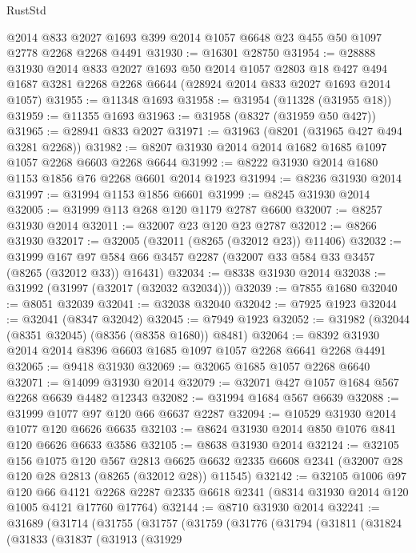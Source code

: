 \begin{lexlean}{RustStd}
\begin{coremodule}
    @2014
    @833
    @2027
    @1693
    @399
    @2014
    @1057
    @6648
    @23
    @455
    @50
    @1097
    @2778
    @2268
    @2268
    @4491
@31930 := @16301 @28750
@31954 := @28888
    @31930
    @2014
    @833
    @2027
    @1693
    @50
    @2014
    @1057
    @2803
    @18
    @427
    @494
    @1687
    @3281
    @2268
    @2268
    @6644
    (@28924 @2014 @833 @2027 @1693 @2014 @1057)
@31955 := @11348 @1693
@31958 := @31954 (@11328 (@31955 @18))
@31959 := @11355 @1693
@31963 := @31958 (@8327 (@31959 @50 @427))
@31965 := @28941 @833 @2027
@31971 := @31963 (@8201 (@31965 @427 @494 @3281 @2268))
@31982 := @8207 @31930 @2014 @2014 @1682 @1685 @1097 @1057 @2268 @6603 @2268 @6644
@31992 := @8222 @31930 @2014 @1680 @1153 @1856 @76 @2268 @6601 @2014 @1923
@31994 := @8236 @31930 @2014
@31997 := @31994 @1153 @1856 @6601
@31999 := @8245 @31930 @2014
@32005 := @31999 @113 @268 @120 @1179 @2787 @6600
@32007 := @8257 @31930 @2014
@32011 := @32007 @23 @120 @23 @2787
@32012 := @8266 @31930
@32017 := @32005 (@32011 (@8265 (@32012 @23)) @11406)
@32032 := @31999
    @167
    @97
    @584
    @66
    @3457
    @2287
    (@32007 @33 @584 @33 @3457 (@8265 (@32012 @33)) @16431)
@32034 := @8338 @31930 @2014
@32038 := @31992 (@31997 (@32017 (@32032 @32034)))
@32039 := @7855 @1680
@32040 := @8051 @32039
@32041 := @32038 @32040
@32042 := @7925 @1923
@32044 := @32041 (@8347 @32042)
@32045 := @7949 @1923
@32052 := @31982 (@32044 (@8351 @32045) (@8356 (@8358 @1680)) @8481)
@32064 := @8392 @31930 @2014 @2014 @8396 @6603 @1685 @1097 @1057 @2268 @6641 @2268 @4491
@32065 := @9418 @31930
@32069 := @32065 @1685 @1057 @2268 @6640
@32071 := @14099 @31930 @2014
@32079 := @32071 @427 @1057 @1684 @567 @2268 @6639 @4482 @12343
@32082 := @31994 @1684 @567 @6639
@32088 := @31999 @1077 @97 @120 @66 @6637 @2287
@32094 := @10529 @31930 @2014 @1077 @120 @6626 @6635
@32103 := @8624 @31930 @2014 @850 @1076 @841 @120 @6626 @6633 @3586
@32105 := @8638 @31930 @2014
@32124 := @32105
    @156
    @1075
    @120
    @567
    @2813
    @6625
    @6632
    @2335
    @6608
    @2341
    (@32007 @28 @120 @28 @2813 (@8265 (@32012 @28)) @11545)
@32142 := @32105
    @1006
    @97
    @120
    @66
    @4121
    @2268
    @2287
    @2335
    @6618
    @2341
    (@8314 @31930 @2014 @120 @1005 @4121 @17760 @17764)
@32144 := @8710 @31930 @2014
@32241 := @31689
    (@31714
      (@31755
        (@31757
          (@31759
            (@31776
              (@31794
                (@31811
                  (@31824
                    (@31833
                      (@31837
                        (@31913
                          (@31929

\end{coremodule}
\end{lexlean}
